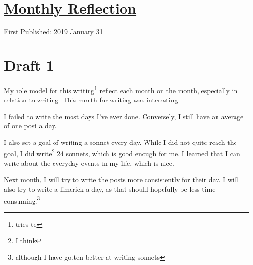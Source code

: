 \documentclass[12pt]{article}[titlepage]
\newcommand{\1}{\={a}}
\newcommand{\2}{\={e}}
\newcommand{\3}{\={\i}}
\newcommand{\4}{\=o}
\newcommand{\5}{\=u}
\newcommand{\6}{\={A}}
\renewcommand{\,}{\textsuperscript{,}}
\begin{document}
\doublespacing
\section{\href{reflection-january-19.html}{Monthly Reflection}}
First Published: 2019 January 31
\section{Draft 1}
My role model for this writing\footnote{tries to} reflect each month on the month, especially in relation to writing.
This month for writing was interesting.

I failed to write the most days I've ever done.
Conversely, I still have an average of one post a day.

I also set a goal of writing a sonnet every day.
While I did not quite reach the goal, I did write\footnote{I think} 24 sonnets, which is good enough for me.
I learned that I can write about the everyday events in my life, which is nice.

Next month, I will try to write the posts more consistently for their day.
I will also try to write a limerick a day, as that should hopefully be less time consuming.\footnote{although I have gotten better at writing sonnets} 
\end{document}

